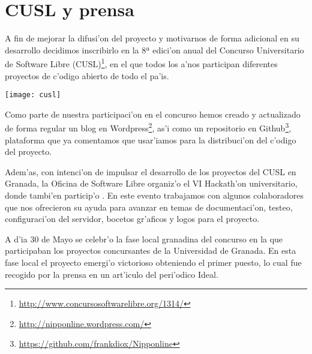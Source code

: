 \section{CUSL y prensa}
\label{sub:cusl_y_prensa}

A fin de mejorar la difusi'on del proyecto y motivarnos de forma adicional en su desarrollo decidimos inscribirlo
en la 8ª edici'on anual del Concurso Universitario de Software Libre 
(CUSL)\footnote{\url{http://www.concursosoftwarelibre.org/1314/}}, en el que todos los a'nos participan diferentes
proyectos de c'odigo abierto de todo el pa'is.

\begin{center}
\texttt{[image: cusl]}
\end{center}

Como parte de nuestra participaci'on en el concurso hemos creado y actualizado de forma regular un blog en 
Wordpress\footnote{\url{http://nipponline.wordpress.com/}}, as'i como un repositorio en 
Github\footnote{\url{https://github.com/frankdiox/Nipponline}}, plataforma que ya comentamos que usar'iamos para 
la distribuci'on del c'odigo del proyecto.

Adem'as, con intenci'on de impulsar el desarrollo de los proyectos del CUSL en Granada, la Oficina de Software Libre
organiz'o el VI Hackath'on universitario, donde tambi'en particip'o \Nipponline{}. En este evento trabajamos con
algunos colaboradores que nos ofrecieron su ayuda para avanzar en temas de documentaci'on, testeo, configuraci'on
del servidor, bocetos gr'aficos y logos para el proyecto.

A d'ia 30 de Mayo se celebr'o la fase local granadina del concurso en la que participaban los proyectos concursantes 
de la Universidad de Granada. En esta fase local el proyecto \Nipponline{} emergi'o victorioso obteniendo el primer 
puesto, lo cual fue recogido por la prensa en un art'iculo del peri'odico Ideal\cite{cuslwinner}.
